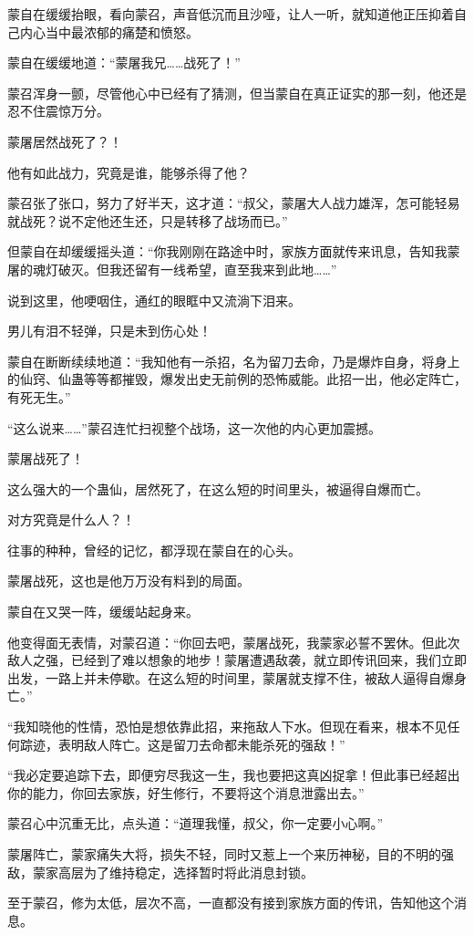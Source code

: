 \begin{this_body}
蒙自在缓缓抬眼，看向蒙召，声音低沉而且沙哑，让人一听，就知道他正压抑着自己内心当中最浓郁的痛楚和愤怒。

蒙自在缓缓地道：“蒙屠我兄……战死了！”

蒙召浑身一颤，尽管他心中已经有了猜测，但当蒙自在真正证实的那一刻，他还是忍不住震惊万分。

蒙屠居然战死了？！

他有如此战力，究竟是谁，能够杀得了他？

蒙召张了张口，努力了好半天，这才道：“叔父，蒙屠大人战力雄浑，怎可能轻易就战死？说不定他还生还，只是转移了战场而已。”

但蒙自在却缓缓摇头道：“你我刚刚在路途中时，家族方面就传来讯息，告知我蒙屠的魂灯破灭。但我还留有一线希望，直至我来到此地……”

说到这里，他哽咽住，通红的眼眶中又流淌下泪来。

男儿有泪不轻弹，只是未到伤心处！

蒙自在断断续续地道：“我知他有一杀招，名为留刀去命，乃是爆炸自身，将身上的仙窍、仙蛊等等都摧毁，爆发出史无前例的恐怖威能。此招一出，他必定阵亡，有死无生。”

“这么说来……”蒙召连忙扫视整个战场，这一次他的内心更加震撼。

蒙屠战死了！

这么强大的一个蛊仙，居然死了，在这么短的时间里头，被逼得自爆而亡。

对方究竟是什么人？！

往事的种种，曾经的记忆，都浮现在蒙自在的心头。

蒙屠战死，这也是他万万没有料到的局面。

蒙自在又哭一阵，缓缓站起身来。

他变得面无表情，对蒙召道：“你回去吧，蒙屠战死，我蒙家必誓不罢休。但此次敌人之强，已经到了难以想象的地步！蒙屠遭遇敌袭，就立即传讯回来，我们立即出发，一路上并未停歇。在这么短的时间里，蒙屠就支撑不住，被敌人逼得自爆身亡。”

“我知晓他的性情，恐怕是想依靠此招，来拖敌人下水。但现在看来，根本不见任何踪迹，表明敌人阵亡。这是留刀去命都未能杀死的强敌！”

“我必定要追踪下去，即便穷尽我这一生，我也要把这真凶捉拿！但此事已经超出你的能力，你回去家族，好生修行，不要将这个消息泄露出去。”

蒙召心中沉重无比，点头道：“道理我懂，叔父，你一定要小心啊。”

蒙屠阵亡，蒙家痛失大将，损失不轻，同时又惹上一个来历神秘，目的不明的强敌，蒙家高层为了维持稳定，选择暂时将此消息封锁。

至于蒙召，修为太低，层次不高，一直都没有接到家族方面的传讯，告知他这个消息。


\end{this_body}

